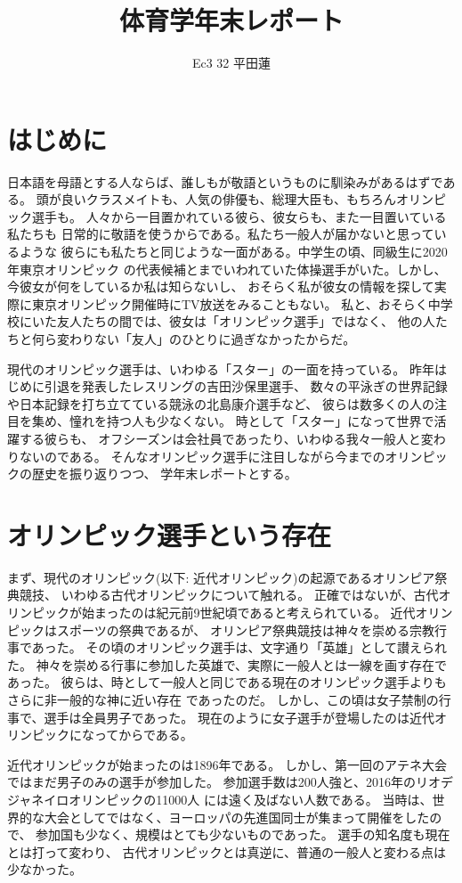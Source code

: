\documentclass{jsarticle}
\title{体育学年末レポート}
\author{Ec3 32 平田蓮}
\date{}
\begin{document}
\maketitle
\section{はじめに}
日本語を母語とする人ならば、誰しもが敬語というものに馴染みがあるはずである。
頭が良いクラスメイトも、人気の俳優も、総理大臣も、もちろんオリンピック選手も。
人々から一目置かれている彼ら、彼女らも、また一目置いている私たちも
日常的に敬語を使うからである。私たち一般人が届かないと思っているような
彼らにも私たちと同じような一面がある。中学生の頃、同級生に2020年東京オリンピック
の代表候補とまでいわれていた体操選手がいた。しかし、今彼女が何をしているか私は知らないし、
おそらく私が彼女の情報を探して実際に東京オリンピック開催時にTV放送をみることもない。
私と、おそらく中学校にいた友人たちの間では、彼女は「オリンピック選手」ではなく、
他の人たちと何ら変わりない「友人」のひとりに過ぎなかったからだ。

現代のオリンピック選手は、いわゆる「スター」の一面を持っている。
昨年はじめに引退を発表したレスリングの吉田沙保里選手、
数々の平泳ぎの世界記録や日本記録を打ち立てている競泳の北島康介選手など、
彼らは数多くの人の注目を集め、憧れを持つ人も少なくない。
時として「スター」になって世界で活躍する彼らも、
オフシーズンは会社員であったり、いわゆる我々一般人と変わりないのである。
そんなオリンピック選手に注目しながら今までのオリンピックの歴史を振り返りつつ、
学年末レポートとする。

\section{オリンピック選手という存在}
まず、現代のオリンピック(以下: 近代オリンピック)の起源であるオリンピア祭典競技、
いわゆる古代オリンピックについて触れる。
正確ではないが、古代オリンピックが始まったのは紀元前9世紀頃であると考えられている。
近代オリンピックはスポーツの祭典であるが、
オリンピア祭典競技は神々を崇める宗教行事であった。
その頃のオリンピック選手は、文字通り「英雄」として讃えられた。
神々を崇める行事に参加した英雄で、実際に一般人とは一線を画す存在であった。
彼らは、時として一般人と同じである現在のオリンピック選手よりもさらに非一般的な神に近い存在
であったのだ。
しかし、この頃は女子禁制の行事で、選手は全員男子であった。
現在のように女子選手が登場したのは近代オリンピックになってからである。

近代オリンピックが始まったのは1896年である。
しかし、第一回のアテネ大会ではまだ男子のみの選手が参加した。
参加選手数は200人強と、2016年のリオデジャネイロオリンピックの11000人
には遠く及ばない人数である。
当時は、世界的な大会としてではなく、ヨーロッパの先進国同士が集まって開催をしたので、
参加国も少なく、規模はとても少ないものであった。
選手の知名度も現在とは打って変わり、
古代オリンピックとは真逆に、普通の一般人と変わる点は少なかった。
\end{document}
